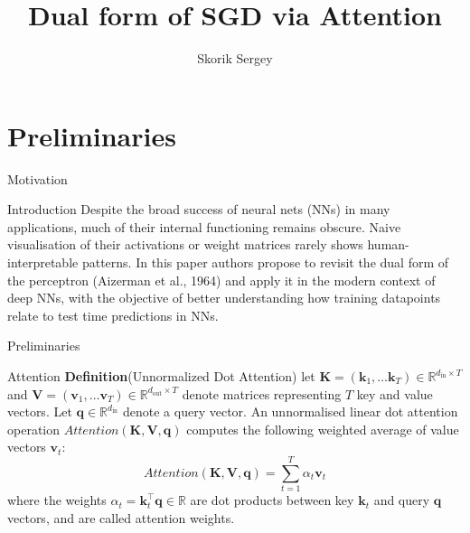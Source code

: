\documentclass{beamer}
\title{Dual form of SGD via Attention}
\author{Skorik Sergey}
\institute{MIPT, 2022}
\begin{document}
\begin{frame}
    \titlepage
\end{frame}


\begin{frame}
    \tableofcontents
\end{frame}

\section{Preliminaries}

\begin{frame}{Motivation}

    \begin{block}{Introduction}
Despite the broad success of neural nets (NNs) in many applications, much of their internal functioning remains obscure. Naive visualisation of their activations or weight matrices rarely shows human-interpretable patterns. In this paper authors propose to revisit the dual form of the perceptron (Aizerman et al., 1964) and apply it in the modern context of deep NNs, with the objective of better understanding how training datapoints relate to test time predictions in NNs.
    \end{block}
\end{frame}

\begin{frame}{Preliminaries}
    \begin{block}{Attention}
        \textbf{Definition}(Unnormalized Dot Attention) let $\mathbf{K} = (\mathbf{k}_1, \ldots \mathbf{k}_T) \in \mathbb{R}^{d_{\text{in}}\times T}$ and $\mathbf{V} = (\mathbf{v}_1, \ldots \mathbf{v}_T) \in \mathbb{R}^{d_{\text{out}}\times T}$ denote matrices representing $T$ key and value vectors. Let $\mathbf{q} \in \mathbb{R}^{d_{\text{in}}}$ denote a query vector. An unnormalised linear dot attention operation $Attention(\mathbf{K}, \mathbf{V}, \mathbf{q})$ computes the following weighted average of value vectors $\mathbf{v}_t$:
        \begin{equation}\label{def_attn}
            Attention(\mathbf{K}, \mathbf{V}, \mathbf{q}) = \sum_{t=1}^T\alpha_t\mathbf{v}_t
        \end{equation}
        where the weights $\alpha_t = \mathbf{k}^\top_t \mathbf{q} \in \mathbb{R}$ are dot products between key $\mathbf{k}_t $ and query $\mathbf{q}$ vectors, and are called attention weights. 
    \end{block}
\end{frame}
\end{document}
